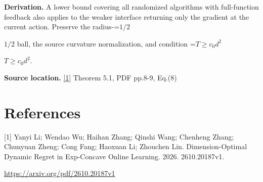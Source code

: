 \documentclass[10pt,a4paper]{article}
\newcommand{\AtlasMath}[1]{\par\begingroup\centering\setbox0=\hbox{$\displaystyle #1$}\ifdim\wd0>1.4\linewidth\typeout{ATLAS WIDE FORMULA: \the\wd0}\fi\ifdim\wd0>\linewidth\resizebox{\linewidth}{!}{\box0}\else\box0\fi\par\endgroup}
\newcommand{\AtlasInlineMath}[1]{\begingroup\setbox0=\hbox{$#1$}\ifdim\wd0>.4\linewidth\endgroup\AtlasMath{#1}\else\endgroup$#1$\fi}
\begin{document}
\textbf{Derivation.} A lower bound covering all randomized algorithms with full-function feedback also applies to the weaker interface returning only the gradient at the current action. Preserve the radius-\AtlasInlineMath{1/2} ball, the source curvature normalization, and condition \AtlasInlineMath{T\ge c_0d^2}.

\textbf{Source location.} \href{https://arxiv.org/pdf/2610.20187v1}{[1]} Theorem 5.1, PDF pp.8-9, Eq.(8)

\section{References}
[1] Yanyi Li; Wendao Wu; Haihan Zhang; Qinshi Wang; Chenheng Zhang; Chunyuan Zheng; Cong Fang; Haoxuan Li; Zhouchen Lin. Dimension-Optimal Dynamic Regret in Exp-Concave Online Learning. 2026. 2610.20187v1.

\url{https://arxiv.org/pdf/2610.20187v1}
\end{document}
